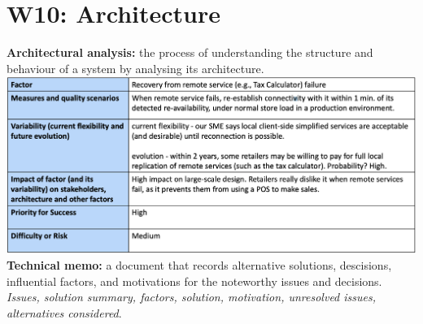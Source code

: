 \section{W10: Architecture}
\textbf{Architectural analysis:} the process of understanding the structure and behaviour of a system by analysing its architecture.\\
\includegraphics[width=\linewidth]{figs/architectural-factor-table.png}
\textbf{Technical memo:} a document that records alternative solutions, descisions, influential factors, and motivations for the noteworthy issues and decisions. \textit{Issues, solution summary, factors, solution, motivation, unresolved issues, alternatives considered}.\\